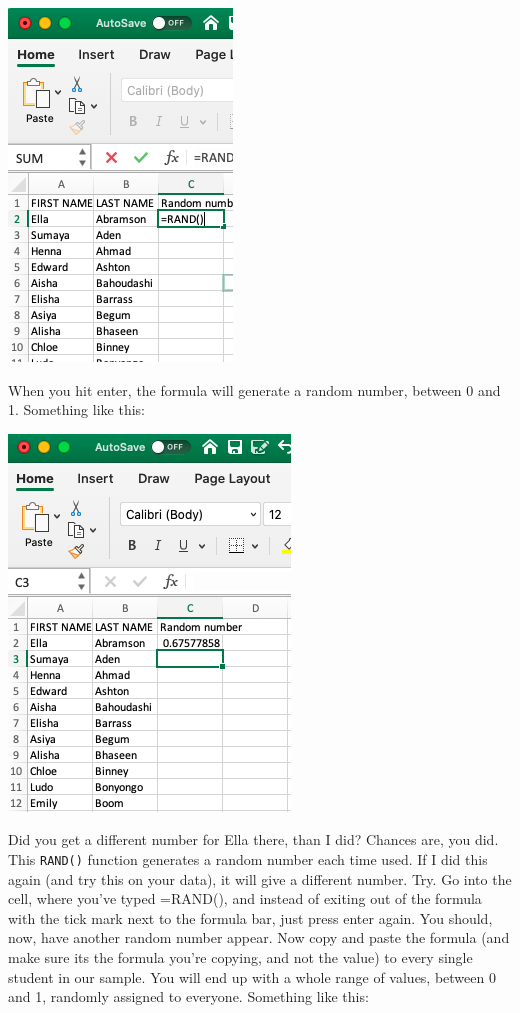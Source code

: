 \documentclass[
]{book}
\begin{document}
\includegraphics{imgs/type_rand.png}

When you hit enter, the formula will generate a random number, between 0 and 1. Something like this:

\includegraphics{imgs/first_rand.png}

Did you get a different number for Ella there, than I did? Chances are, you did. This \texttt{RAND()} function generates a random number each time used. If I did this again (and try this on your data), it will give a different number. Try. Go into the cell, where you've typed =RAND(), and instead of exiting out of the formula with the tick mark next to the formula bar, just press enter again. You should, now, have another random number appear. Now copy and paste the formula (and make sure its the formula you're copying, and not the value) to every single student in our sample. You will end up with a whole range of values, between 0 and 1, randomly assigned to everyone. Something like this:
\end{document}

